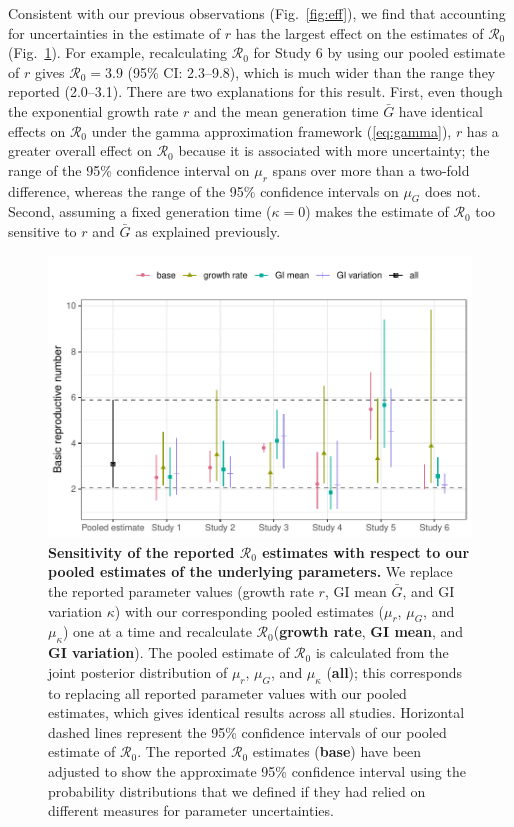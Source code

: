\documentclass[12pt]{article}
\newcommand{\eref}[1]{(\ref{eq:#1})}
\newcommand{\fref}[1]{Fig.~\ref{fig:#1}}
\newcommand{\Rx}[1]{\ensuremath{{\mathcal R}_{#1}}}
\newcommand{\Ro}{\Rx{0}\xspace}
\begin{document}
Consistent with our previous observations (\fref{eff}),
we find that accounting for uncertainties in the estimate of $r$ has the largest effect on the estimates of \Ro (\fref{R0}).
For example, recalculating \Ro for Study 6 by using our pooled estimate of $r$ gives $\mathcal R_0 = 3.9$ (95\% CI: 2.3--9.8), which is much wider than the range they reported (2.0--3.1).
There are two explanations for this result.
First, even though the exponential growth rate $r$ and the mean generation time $\bar G$ have identical effects on \Ro under the gamma approximation framework \eref{gamma},
$r$ has a greater overall effect on \Ro because it is associated with more uncertainty;
the range of the 95\% confidence interval on $\mu_r$ spans over more than a two-fold difference, whereas the range of the 95\% confidence intervals on $\mu_G$ does not.
Second, assuming a fixed generation time ($\kappa=0$) makes the estimate of \Ro too sensitive to $r$ and $\bar G$ as explained previously.

\begin{figure}[!th]
\includegraphics[width=\textwidth]{compare_R0.pdf}
\caption{
\textbf{Sensitivity of the reported \Ro estimates with respect to our pooled estimates of the underlying parameters.}
We replace the reported parameter values (growth rate $r$, GI mean $\bar G$, and GI variation $\kappa$) with our corresponding pooled estimates ($\mu_r$, $\mu_G$, and $\mu_\kappa$) one at a time and recalculate \Ro (\textbf{growth rate}, \textbf{GI mean}, and \textbf{GI variation}).
The pooled estimate of \Ro is calculated from the joint posterior distribution of $\mu_r$, $\mu_G$, and $\mu_\kappa$ (\textbf{all});
this corresponds to replacing all reported parameter values with our pooled estimates, which gives identical results across all studies.
Horizontal dashed lines represent the 95\% confidence intervals of our pooled estimate of \Ro.
The reported \Ro estimates (\textbf{base}) have been adjusted to show the approximate 95\% confidence interval using the probability distributions that we defined if they had relied on different measures for parameter uncertainties.
}
\label{fig:R0}
\end{figure}
\end{document}
